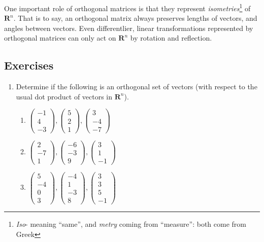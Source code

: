 \documentclass[12pt]{article}
\numberwithin{equation}{subsection}
\numberwithin{figure}{subsection}
\theoremstyle{note}
\newcommand{\R}{\mathbf{R}}
\begin{document}
One important role of orthogonal matrices is that they represent \textit{isometries}\footnote{\textit{Iso}- meaning ``same'', and \textit{metry} coming from ``measure'': both come from Greek} of $\R^n$. That is to say, an orthogonal matrix always preserves lengths of vectors, and angles between vectors. Even differentlier, linear transformations represented by orthogonal matrices can only act on $\R^n$ by rotation and reflection. 
\subsection{Exercises}

\begin{enumerate}[label=\arabic*.]

\item Determine if the following is an orthogonal set of vectors (with respect to the usual dot product of vectors in $\R^n$).
\begin{enumerate}
	\item $\begin{pmatrix}  -1 \\ 4 \\ -3\end{pmatrix}, \begin{pmatrix} 5 \\ 2 \\1\end{pmatrix},\begin{pmatrix}   3 \\ -4 \\ -7\end{pmatrix}$
	\item  $\begin{pmatrix}  2 \\ -7 \\ 1\end{pmatrix}, \begin{pmatrix}-6 \\ -3 \\ 9\end{pmatrix},\begin{pmatrix}   3 \\ 1 \\ -1\end{pmatrix}$
	\item  $\begin{pmatrix} 5 \\ -4 \\ 0 \\ 3\end{pmatrix}, \begin{pmatrix}  -4 \\ 1 \\ -3 \\ 8\end{pmatrix},\begin{pmatrix}   3 \\ 3\\ 5 \\ -1\end{pmatrix}$
\end{enumerate}


\end{enumerate}
\end{document}
